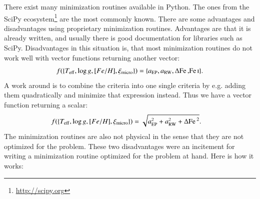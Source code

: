 \documentclass{aa}
\begin{document}
There exist many minimization routines available in Python. The ones from the
SciPy ecosystem\footnote{\url{http://scipy.org}} are the most commonly known.
There are some advantages and disadvantages using proprietary minimization
routines. Advantages are that it is already written, and usually there is good
documentation for libraries such as SciPy. Disadvantages in this situation is,
that most minimization routines do not work well with vector functions returning
another vector:
\begin{align}
    f(\{T_\mathrm{eff}, \log g, [Fe/H], \xi_\mathrm{micro}\}) = \{a_\mathrm{EP}, a_\mathrm{RW}, \Delta\ion{Fe}, \ion{Fe}{I}\}.
\end{align}
A work around is to combine the criteria into one single criteria by e.g. adding
them quadratically and minimize that expression instead. Thus we have a vector
function returning a scalar:
\begin{align}
    f(\{T_\mathrm{eff}, \log g, [Fe/H], \xi_\mathrm{micro}\}) &= \sqrt{a_\mathrm{EP}^2 + a_\mathrm{RW}^2 + \Delta\ion{Fe}{}^2}.
\end{align}
The minimization routines are also not physical in the sense that they are not
optimized for the problem. These two disadvantages were an incitement for
writing a minimization routine optimized for the problem at hand. Here is how it
works:
\end{document}
